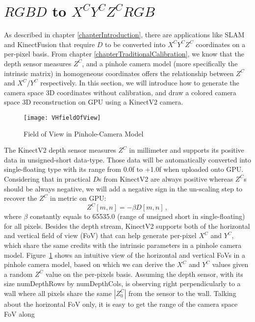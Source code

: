 \section{\(RGBD\) to \(X^CY^CZ^CRGB\)}
\label{sectionCameraSpaceReconstruction}
As described in chapter \ref{chapterIntroduction}, there are applications like SLAM and KinectFusion that require \(D\) to be converted into \(X^CY^CZ^C\) coordinates on a per-pixel basis. From chapter \ref{chapterTraditionalCalibration}, we know that the depth sensor measures \(Z^C\), and a pinhole camera model (more specifically the intrinsic matrix) in homogeneous coordinates offers the relationship between \(Z^C\) and \(X^C/Y^C\) respectively. In this section, we will introduce how to generate the camera space 3D coordinates without calibration, and draw a colored camera space 3D reconstruction on GPU using a KinectV2 camera.
\\\indent
%
\begin{figure}[!b]
\centering
\texttt{[image: VHfieldOfView]}
\caption{Field of View in Pinhole-Camera Model}
\label{VHfieldOfView}
\end{figure}%
%
The KinectV2 depth sensor measures \(Z^C\) in millimeter and supports its positive data in unsigned-short data-type. Those data will be automatically converted into single-floating type with its range from 0.0f to +1.0f when uploaded onto GPU. Considering that in practical \(D\)s from KinectV2 are always positive whereas \(Z^C\)s should be always negative, we will add a negative sign in the un-scaling step to recover the \(Z^C\) in metric on GPU:
\begin{equation}
Z^C[m, n] = - \beta D[m, n] \, ,
\label{unscalingZc}
\end{equation}%
\noindent
where \(\beta\) constantly equals to 65535.0 (range of unsigned short in single-floating) for all pixels. Besides the depth stream, KinectV2 supports both of the horizontal and vertical field of view (FoV) that can help generate per-pixel \(X^C\) and \(Y^C\), which share the same credits with the intrinsic parameters in a pinhole camera model. Figure~\ref{VHfieldOfView} shows an intuitive view of the horizontal and vertical FoVs in a pinhole camera model, based on which we can derive the \(X^C\) and \(Y^C\) values given a random \(Z^C\) value on the per-pixels basis. Assuming the depth sensor, with its size numDepthRows by numDepthCols, is observing right perpendicularly to a wall where all pixels share the same \(|Z^C_0|\) from the sensor to the wall. Talking about the horizontal FoV only, it is easy to get the range of the camera space FoV along 
